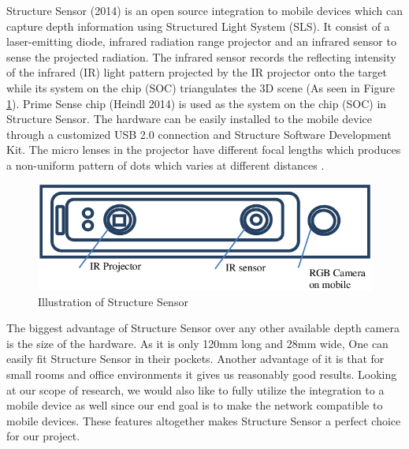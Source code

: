 Structure Sensor (2014) is an open source integration to mobile devices which can capture depth information using Structured Light System (SLS). It consist of a laser-emitting diode, infrared radiation range projector and an infrared sensor to sense the projected radiation. The infrared sensor records the reflecting intensity of the infrared (IR) light pattern projected by the IR projector onto the target while its system on the chip (SOC) triangulates the 3D scene  \cite{Kalantari} (As seen in Figure \ref{fig:Structuresensor}). Prime Sense chip (Heindl 2014) is used as the system on the chip (SOC) in Structure Sensor. The hardware can be easily installed to the mobile device through a customized USB 2.0 connection and Structure Software Development Kit. The micro lenses in the projector have different focal lengths which produces a non-uniform pattern of dots which varies at different distances \cite{Kalantari}. \\


\begin{figure}[h]
\centering
    \includegraphics[scale=0.29]{Figures/illustration-of-structure-sensor.png}
    \caption{Illustration of Structure Sensor}
    \label{fig:Structuresensor}
\end{figure}

The biggest advantage of Structure Sensor over any other available depth camera is the size of the hardware. As it is only 120mm long and 28mm wide, One can easily fit Structure Sensor in their pockets. Another advantage of it is that for small rooms and office environments it gives us reasonably good results. Looking at our scope of research, we would also like to fully utilize the integration to a mobile device as well since our end goal is to make the network compatible to mobile devices. These features altogether makes Structure Sensor a perfect choice for our project.\\